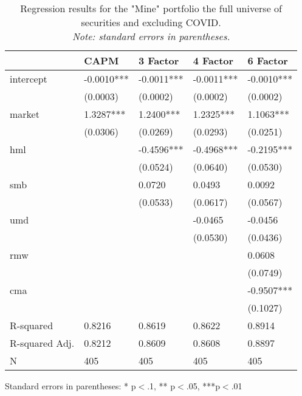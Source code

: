 \begin{appendices}
\begin{table}
\caption{Regression results for the "Mine" portfolio the full universe of securities and excluding COVID. \\ \textit{Note: standard errors in parentheses.}}
\label{tab:mine_all_pre}
\begin{center}
\begin{tabular}{lllll}
\hline
               & CAPM       & 3 Factor   & 4 Factor   & 6 Factor    \\
\hline
intercept          & -0.0010*** & -0.0011*** & -0.0011*** & -0.0010***  \\
               & (0.0003)   & (0.0002)   & (0.0002)   & (0.0002)    \\
market           & 1.3287***  & 1.2400***  & 1.2325***  & 1.1063***   \\
               & (0.0306)   & (0.0269)   & (0.0293)   & (0.0251)    \\
hml            &            & -0.4596*** & -0.4968*** & -0.2195***  \\
               &            & (0.0524)   & (0.0640)   & (0.0530)    \\
smb            &            & 0.0720     & 0.0493     & 0.0092      \\
               &            & (0.0533)   & (0.0617)   & (0.0567)    \\
umd            &            &            & -0.0465    & -0.0456     \\
               &            &            & (0.0530)   & (0.0436)    \\
rmw            &            &            &            & 0.0608      \\
               &            &            &            & (0.0749)    \\
cma            &            &            &            & -0.9507***  \\
               &            &            &            & (0.1027)    \\
R-squared      & 0.8216     & 0.8619     & 0.8622     & 0.8914      \\
R-squared Adj. & 0.8212     & 0.8609     & 0.8608     & 0.8897      \\
N              & 405        & 405        & 405        & 405         \\
\hline
\end{tabular}
\end{center}
{\footnotesize Standard errors in parentheses: * p$<$.1, ** p$<$.05, ***p$<$.01\par}
\end{table}



\end{appendices}
